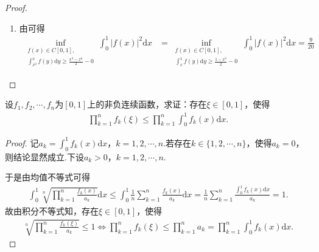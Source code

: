 \documentclass[../../main.tex]{subfiles}
\begin{document}
\begin{proof}
\begin{enumerate}
\item 由可得
\begin{align*}
\inf_{\substack{f(x) \in C[0,1], \\ \int_{x^2}^x f(y) \mathrm{d}y \geqslant \frac{x^3 - x^6}{2} - 0}} \int_0^1 |f(x)|^2 \mathrm{d}x &= \inf_{\substack{f(x) \in C[0,1], \\ \int_x^1 f(y) \mathrm{d}y \geqslant \frac{1 - x^3}{2} - 0}} \int_0^1 |f(x)|^2 \mathrm{d}x = \frac{9}{20}
\end{align*}
\end{enumerate}

\end{proof}

\begin{example}
设$f_1,f_2,\cdots,f_n$为$[0,1]$上的非负连续函数，求证：存在$\xi \in [0,1]$，使得
\begin{align*}
\prod_{k=1}^n f_k(\xi) \leqslant \prod_{k=1}^n \int_0^1 f_k(x)\mathrm{d}x.
\end{align*}
\end{example}
\begin{proof}
记$a_k=\int_0^1 f_k(x)\mathrm{d}x$，$k=1,2,\cdots,n$.若存在$k\in \{1,2,\cdots,n\}$，使得$a_k=0$，则结论显然成立.下设$a_k>0$，$k=1,2,\cdots,n$.

于是由均值不等式可得
\begin{align*}
\int_0^1 \sqrt[n]{\prod_{k=1}^n \frac{f_k(x)}{a_k}} \mathrm{d}x \leqslant \int_0^1 \frac{1}{n}\sum_{k=1}^n \frac{f_k(x)}{a_k} \mathrm{d}x = \frac{1}{n}\sum_{k=1}^n \frac{\int_0^1 f_k(x)\mathrm{d}x}{a_k} = 1.
\end{align*}
故由积分不等式知，存在$\xi \in [0,1]$，使得
\begin{align*}
\sqrt[n]{\prod_{k=1}^n \frac{f_k(\xi)}{a_k}} \leqslant 1 \Longleftrightarrow \prod_{k=1}^n f_k(\xi) \leqslant \prod_{k=1}^n a_k = \prod_{k=1}^n \int_0^1 f_k(x)\mathrm{d}x.
\end{align*}

\end{proof}
\end{document}
